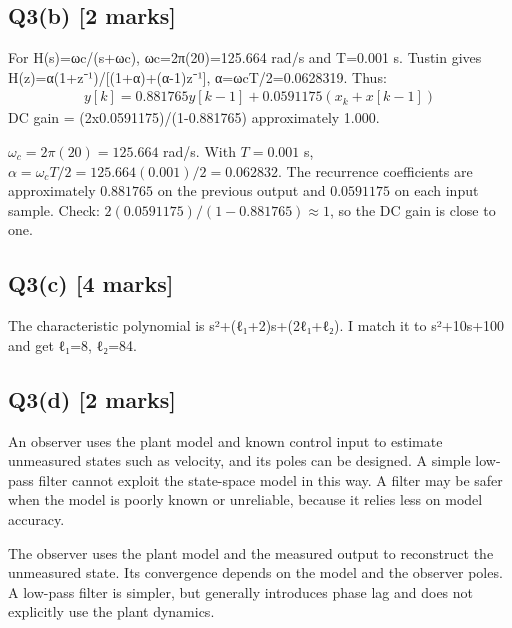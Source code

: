 \documentclass[11pt,a4paper]{article}
\begin{document}
\subsection*{Q3(b) \hfill [2 marks]}

For H(s)=ωc/(s+ωc), ωc=2π(20)=125.664 rad/s and T=0.001 s.
Tustin gives H(z)=α(1+z⁻¹)/[(1+α)+(α-1)z⁻¹], α=ωcT/2=0.0628319.
Thus:\[\begin{aligned}y[k]=0.881765y[k-1]+0.0591175(x_k+x[k-1])\end{aligned}\]
DC gain = (2x0.0591175)/(1-0.881765) approximately 1.000.\par\smallskip $\omega_c=2\pi(20)=125.664$ rad/s. With $T=0.001$ s, $\alpha=\omega_cT/2=125.664(0.001)/2=0.062832$. The recurrence coefficients are approximately $0.881765$ on the previous output and $0.0591175$ on each input sample. Check: $2(0.0591175)/(1-0.881765)\approx1$, so the DC gain is close to one.

\subsection*{Q3(c) \hfill [4 marks]}

The characteristic polynomial is s²+(ℓ₁+2)s+(2ℓ₁+ℓ₂).
I match it to s²+10s+100 and get ℓ₁=8, ℓ₂=84.

\subsection*{Q3(d) \hfill [2 marks]}

An observer uses the plant model and known control input to estimate unmeasured states such as velocity, and its poles can be designed.
A simple low-pass filter cannot exploit the state-space model in this way.
A filter may be safer when the model is poorly known or unreliable, because it relies less on model accuracy.\par\smallskip The observer uses the plant model and the measured output to reconstruct the unmeasured state. Its convergence depends on the model and the observer poles. A low-pass filter is simpler, but generally introduces phase lag and does not explicitly use the plant dynamics.
\end{document}
